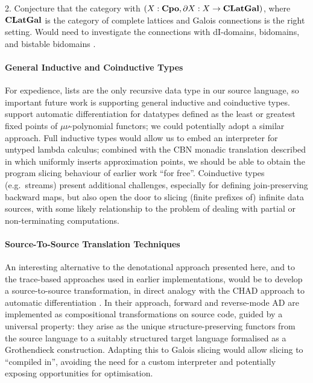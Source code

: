 2. Conjecture that the category with $(X : \mathbf{Cpo}, \partial X : X \to \mathbf{CLatGal})$, where $\mathbf{CLatGal}$ is the category of complete lattices and Galois connections is the right setting. Would need to investigate the connections with dI-domains, bidomains, and bistable bidomains \cite{laird07}.

\paragraph{General Inductive and Coinductive Types}

For expedience, lists are the only recursive data type in our source language, so important future work is
supporting general inductive and coinductive types. \citet{nunes2023} support automatic differentiation for
datatypes defined as the least or greatest fixed points of $\mu\nu$-polynomial functors; we could potentially
adopt a similar approach. Full inductive types would allow us to embed an interpreter for untyped lambda
calculus; combined with the CBN monadic translation described in  which uniformly inserts
approximation points, we should be able to obtain the program slicing behaviour of earlier \GPS work ``for
free''. Coinductive types (e.g.~streams) present additional challenges, especially for defining
join-preserving backward maps, but also open the door to slicing (finite prefixes of) infinite data sources,
with some likely relationship to the problem of dealing with partial or non-terminating computations.

\paragraph{Source-To-Source Translation Techniques}


An interesting alternative to the denotational approach presented here, and to the trace-based approaches used
in earlier \GPS implementations, would be to develop a source-to-source transformation, in direct analogy with
the CHAD approach to automatic differentiation \cite{vakar22,nunes2023}. In their approach, forward and
reverse-mode AD are implemented as compositional transformations on source code, guided by a universal
property: they arise as the unique structure-preserving functors from the source language to a suitably
structured target language formalised as a Grothendieck construction. Adapting this to Galois slicing would
allow slicing to ``compiled in'', avoiding the need for a custom interpreter and potentially exposing
opportunities for optimisation.

